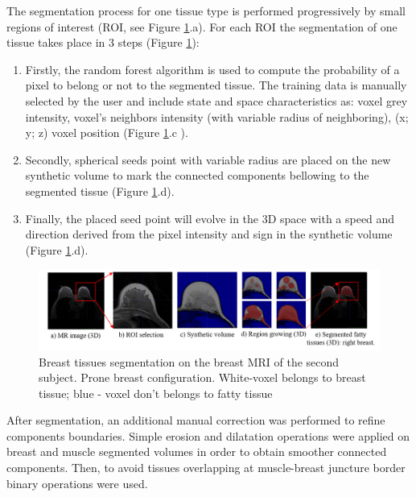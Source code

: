 The segmentation process for one tissue type is performed progressively by small regions of interest (ROI, see Figure \ref{fig:breasttissuessegmentation}.a). For each ROI the segmentation of one tissue takes place in 3 steps (Figure \ref{fig:breasttissuessegmentation}):
\begin{enumerate}
\item Firstly, the random forest algorithm is used to compute the probability of a pixel to belong or not to the segmented tissue. The training data is manually selected by the user and include state and space characteristics as: voxel grey intensity, voxel's neighbors intensity (with variable radius of neighboring), (x; y; z) voxel position (Figure \ref{fig:breasttissuessegmentation}.c ).

\item Secondly, spherical seeds point with variable radius are placed on the new synthetic volume to mark the connected components bellowing to the segmented tissue (Figure \ref{fig:breasttissuessegmentation}.d).
\item Finally, the placed seed point will evolve in the 3D space with a speed and direction derived from the pixel intensity and sign in the synthetic volume (Figure \ref{fig:breasttissuessegmentation}.d).
\end{enumerate}

 
 \begin{figure}[H]
\centering
\includegraphics[width=1\textwidth,keepaspectratio]{figures/tissues_segmentation.png} 
\caption{Breast tissues segmentation on the breast MRI of the second subject. Prone breast configuration. White-voxel belongs to breast tissue; blue - voxel don't belongs to fatty tissue} \label{fig:breasttissuessegmentation}
\end{figure}

 After segmentation, an additional manual correction was performed to refine components boundaries. Simple erosion and dilatation operations were applied on breast and muscle segmented volumes in order to obtain smoother connected components. Then, to avoid tissues overlapping at muscle-breast juncture border binary operations were used.
 

